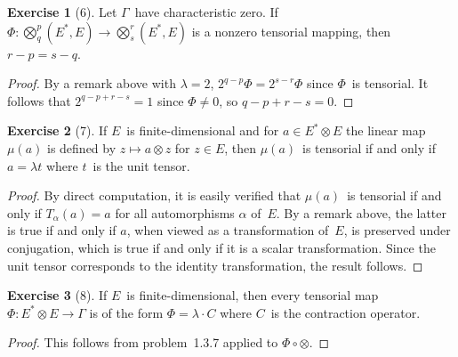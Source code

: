 \documentclass[letterpaper,12pt]{article}
\newcommand{\after}{\circ}
\newcommand{\mult}{\cdot}
\newcommand{\tprod}{\otimes}
\newcommand{\bigtprod}{\bigotimes}
\newcommand{\medtprod}{{\textstyle\bigtprod}}
\theoremstyle{definition}
\newtheorem*{exer}{Exercise}
\theoremstyle{remark}
\begin{document}
\begin{exer}[6]
Let \(\Gamma\)~have characteristic zero. If \(\Phi:\medtprod^p_q(E^*,E)\to\medtprod^r_s(E^*,E)\) is a nonzero tensorial mapping, then \(r-p=s-q\).
\end{exer}
\begin{proof}
By a remark above with \(\lambda=2\), \(2^{q-p}\Phi=2^{s-r}\Phi\) since \(\Phi\)~is tensorial. It follows that \(2^{q-p+r-s}=1\) since \(\Phi\ne 0\), so \(q-p+r-s=0\).
\end{proof}

\begin{exer}[7]
If \(E\)~is finite-dimensional and for \(a\in E^*\tprod E\) the linear map~\(\mu(a)\) is defined by \(z\mapsto a\tprod z\) for \(z\in E\), then \(\mu(a)\)~is tensorial if and only if \(a=\lambda t\) where \(t\)~is the unit tensor.
\end{exer}
\begin{proof}
By direct computation, it is easily verified that \(\mu(a)\)~is tensorial if and only if \(T_{\alpha}(a)=a\) for all automorphisms \(\alpha\) of~\(E\). By a remark above, the latter is true if and only if \(a\), when viewed as a transformation of~\(E\), is preserved under conjugation, which is true if and only if it is a scalar transformation. Since the unit tensor corresponds to the identity transformation, the result follows.
\end{proof}

\begin{exer}[8]
If \(E\)~is finite-dimensional, then every tensorial map \(\Phi:E^*\tprod E\to\Gamma\) is of the form \(\Phi=\lambda\mult C\) where \(C\)~is the contraction operator.
\end{exer}
\begin{proof}
This follows from problem~1.3.7 applied to \(\Phi\after\tprod\).
\end{proof}
\end{document}
